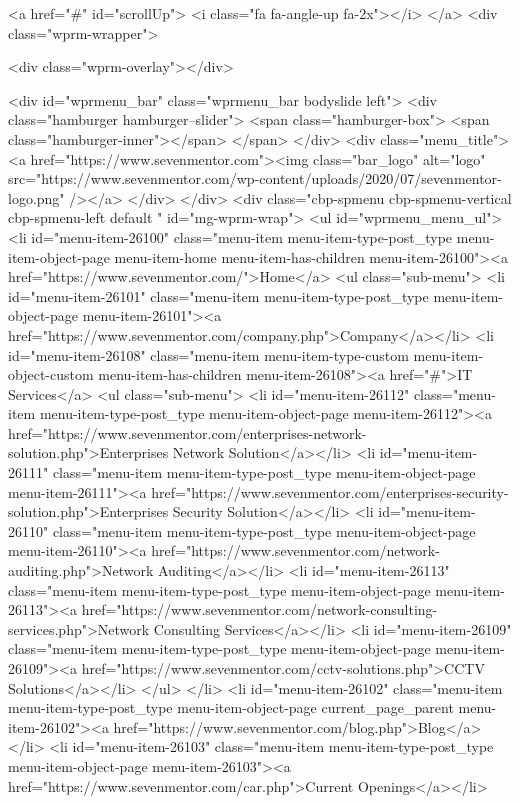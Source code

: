 {<a href="#" id="scrollUp">
<i class="fa fa-angle-up fa-2x"></i>
</a>
<div class="wprm-wrapper">

<div class="wprm-overlay"></div>

<div id="wprmenu_bar" class="wprmenu_bar bodyslide left">
<div class="hamburger hamburger--slider">
<span class="hamburger-box">
<span class="hamburger-inner"></span>
</span>
</div>
<div class="menu_title">
<a href="https://www.sevenmentor.com"><img class="bar_logo" alt="logo" src="https://www.sevenmentor.com/wp-content/uploads/2020/07/sevenmentor-logo.png" /></a> </div>
</div>
<div class="cbp-spmenu cbp-spmenu-vertical cbp-spmenu-left default " id="mg-wprm-wrap">
<ul id="wprmenu_menu_ul">
<li id="menu-item-26100" class="menu-item menu-item-type-post_type menu-item-object-page menu-item-home menu-item-has-children menu-item-26100"><a href="https://www.sevenmentor.com/">Home</a>
<ul class="sub-menu">
<li id="menu-item-26101" class="menu-item menu-item-type-post_type menu-item-object-page menu-item-26101"><a href="https://www.sevenmentor.com/company.php">Company</a></li>
<li id="menu-item-26108" class="menu-item menu-item-type-custom menu-item-object-custom menu-item-has-children menu-item-26108"><a href="#">IT Services</a>
<ul class="sub-menu">
<li id="menu-item-26112" class="menu-item menu-item-type-post_type menu-item-object-page menu-item-26112"><a href="https://www.sevenmentor.com/enterprises-network-solution.php">Enterprises Network Solution</a></li>
<li id="menu-item-26111" class="menu-item menu-item-type-post_type menu-item-object-page menu-item-26111"><a href="https://www.sevenmentor.com/enterprises-security-solution.php">Enterprises Security Solution</a></li>
<li id="menu-item-26110" class="menu-item menu-item-type-post_type menu-item-object-page menu-item-26110"><a href="https://www.sevenmentor.com/network-auditing.php">Network Auditing</a></li>
<li id="menu-item-26113" class="menu-item menu-item-type-post_type menu-item-object-page menu-item-26113"><a href="https://www.sevenmentor.com/network-consulting-services.php">Network Consulting Services</a></li>
<li id="menu-item-26109" class="menu-item menu-item-type-post_type menu-item-object-page menu-item-26109"><a href="https://www.sevenmentor.com/cctv-solutions.php">CCTV Solutions</a></li>
</ul>
</li>
<li id="menu-item-26102" class="menu-item menu-item-type-post_type menu-item-object-page current_page_parent menu-item-26102"><a href="https://www.sevenmentor.com/blog.php">Blog</a></li>
<li id="menu-item-26103" class="menu-item menu-item-type-post_type menu-item-object-page menu-item-26103"><a href="https://www.sevenmentor.com/car.php">Current Openings</a></li>
}
